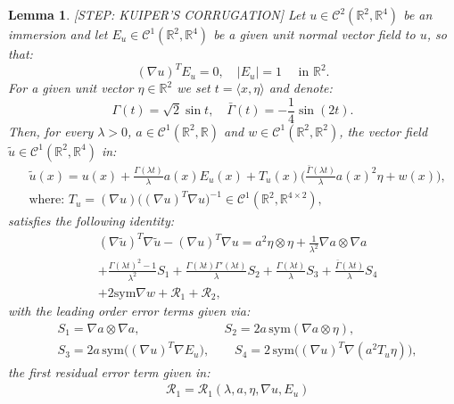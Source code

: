 \documentclass[reqno,twoside,11pt]{amsart}
\newcommand{\sym}{\mathrm{sym}}
\newcommand{\R}{\mathbb{R}}
\numberwithin{equation}{section}
\theoremstyle{plain}
\newtheorem{lemma}[theorem]{Lemma}
\theoremstyle{definition}
\begin{document}
\begin{lemma}\label{lem_step2} \textup{[STEP: KUIPER'S CORRUGATION]}
Let $u\in\mathcal{C}^2(\R^2,\R^4)$ be an immersion and let $E_u
\in\mathcal{C}^{1}(\R^2, \R^4)$ be a given unit normal vector field to $u$, so that:
$$(\nabla u)^T E_u = 0,\quad |E_u|=1 \quad\mbox{ in } \R^2.$$
For a given unit vector $\eta\in\R^2$ we set $t=\langle x, \eta\rangle$ and denote:
$$\Gamma(t) = \sqrt{2}\sin t, \quad \bar\Gamma(t) = -\frac{1}{4}\sin(2 t).$$
Then, for every $\lambda>0$, $a\in\mathcal{C}^1(\R^2, \R)$ and
$w\in\mathcal{C}^1(\R^2, \R^2)$, the
vector field $\tilde u\in \mathcal{C}^1(\R^2, \R^4)$ in:
\begin{equation}\label{ansi}
\begin{split}
& \tilde u(x) = u(x)+ \frac{\Gamma(\lambda t )}{\lambda} a(x) E_u(x) + 
T_u(x)\Big(\frac{\bar\Gamma(\lambda t )}{\lambda}a(x)^2\eta+w(x)\Big),
\\ & \mbox{where: } T_u = (\nabla u)\big((\nabla u)^T\nabla
u\big)^{-1}\in\mathcal{C}^1(\R^2, \R^{4\times 2}),
\end{split}
\end{equation}
satisfies the following identity:
\begin{equation}\label{sisi}
\begin{split}
& (\nabla \tilde u)^T\nabla \tilde u - (\nabla u)^T\nabla u = 
a^2\eta\otimes \eta +  \frac{1}{\lambda^2}\nabla a\otimes \nabla a 
\\ & +\frac{\Gamma(\lambda t)^2-1}{\lambda^2}S_1 
+\frac{\Gamma(\lambda t)\Gamma'(\lambda t)}{\lambda}S_2
+ \frac{\Gamma(\lambda t)}{\lambda}S_3
+ \frac{\bar\Gamma(\lambda t)}{\lambda}S_4 \\ & + 2\sym\nabla w +
\mathcal{R}_1 + \mathcal{R}_2,
\end{split}
\end{equation}
with the leading order error terms given via:
\begin{equation*}
\begin{split}
& S_1= \nabla a\otimes \nabla a, 
\qquad \qquad \qquad \;\; \, S_2= 2a\,\sym(\nabla a\otimes\eta), \\ 
& S_3 = 2a\,\sym\big((\nabla u)^T\nabla E_u\big),\qquad 
S_4 = 2\,\sym\big((\nabla u)^T\nabla(a^2 T_u\eta)\big), 
\end{split}
\end{equation*}
the first residual error term given in:
\begin{equation*}
\begin{split}
& \mathcal{R}_1 = \mathcal{R}_1(\lambda, a, \eta, \nabla u, E_u) 

\end{split}
\end{equation*}
\end{lemma}
\end{document}
